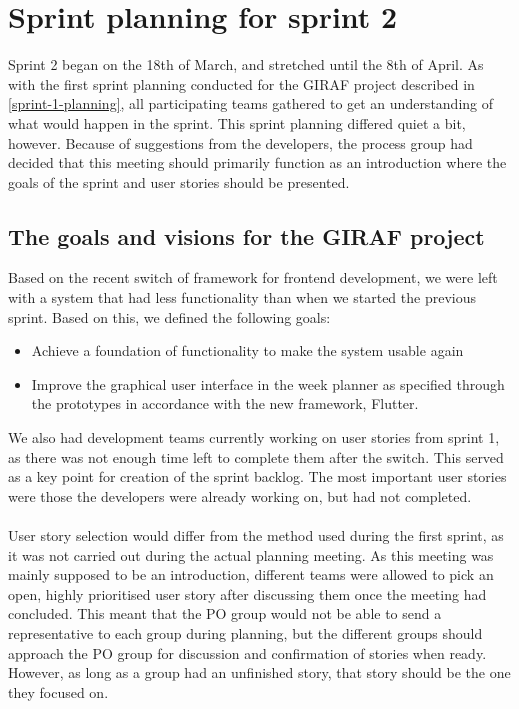\section{Sprint planning for sprint 2}
Sprint 2 began on the 18th of March, and stretched until the 8th of April.
As with the first sprint planning conducted for the GIRAF project described in \autoref{sprint-1-planning}, all participating teams gathered to get an understanding of what would happen in the sprint.
This sprint planning differed quiet a bit, however.
Because of suggestions from the developers, the process group had decided that this meeting should primarily function as an introduction where the goals of the sprint and user stories should be presented.

\subsection{The goals and visions for the GIRAF project}
Based on the recent switch of framework for frontend development, we were left with a system that had less functionality than when we started the previous sprint.
Based on this, we defined the following goals:
\begin{itemize}
    \item Achieve a foundation of functionality to make the system usable again
    \item Improve the graphical user interface in the week planner as specified through the prototypes in accordance with the new framework, Flutter.
\end{itemize}
We also had development teams currently working on user stories from sprint 1, as there was not enough time left to complete them after the switch.
This served as a key point for creation of the sprint backlog.
The most important user stories were those the developers were already working on, but had not completed. 
\\\\
User story selection would differ from the method used during the first sprint, as it was not carried out during the actual planning meeting.
As this meeting was mainly supposed to be an introduction, different teams were allowed to pick an open, highly prioritised user story after discussing them once the meeting had concluded.
This meant that the PO group would not be able to send a representative to each group during planning, but the different groups should approach the PO group for discussion and confirmation of stories when ready.
However, as long as a group had an unfinished story, that story should be the one they focused on.
